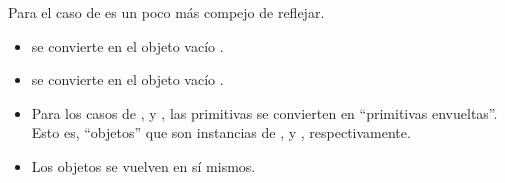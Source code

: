 Para el caso de  es un poco más compejo de reflejar.

\begin{itemize}
\item {} se convierte en el objeto vacío \code{\{\}}.
\item {} se convierte en el objeto vacío \code{\{\}}.
\item Para los casos de ,  y , las primitivas se convierten en "`primitivas envueltas"'. Esto es, "`objetos"' que son instancias de ,  y , respectivamente.
\item Los objetos se vuelven en sí mismos.
\end{itemize}